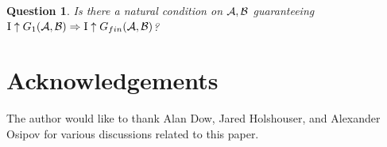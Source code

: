 \documentclass{amsart}
\theoremstyle{plain}
\newtheorem{question}[theorem]{Question}
\theoremstyle{definition}
\theoremstyle{remark}
\theoremstyle{plain}
\theoremstyle{definition}
\theoremstyle{remark}
\begin{document}
\begin{question}
Is there a natural condition on \(\mathcal{A},\mathcal{B}\) guaranteeing
\(\mathrm{I}\uparrow G_1(\mathcal{A},\mathcal{B})\Rightarrow\mathrm{I}\uparrow G_{fin}(\mathcal{A},\mathcal{B})\)?
\end{question}

\section{Acknowledgements}

The author would like to thank Alan Dow, Jared Holshouser,
and Alexander Osipov for various discussions related to this paper.



\end{document}
